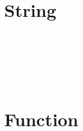 \begin{lstlisting}[language=JavaScript]

\end{lstlisting}


\chapter{String}



\begin{lstlisting}[language=JavaScript]

\end{lstlisting}




\begin{lstlisting}[language=JavaScript]

\end{lstlisting}





\begin{lstlisting}[language=JavaScript]

\end{lstlisting}




\begin{lstlisting}[language=JavaScript]

\end{lstlisting}





\begin{lstlisting}[language=JavaScript]

\end{lstlisting}




\begin{lstlisting}[language=JavaScript]

\end{lstlisting}





\begin{lstlisting}[language=JavaScript]

\end{lstlisting}


\chapter{Function}



